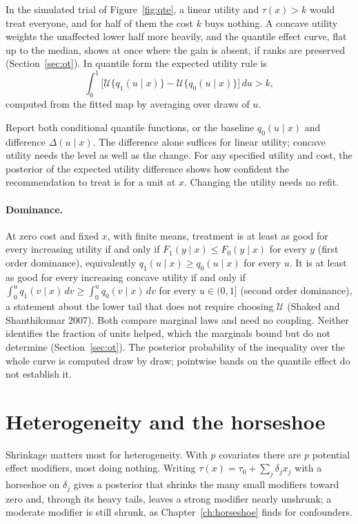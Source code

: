 In the simulated trial of Figure~\ref{fig:qte}, a linear utility and $\tau(x) > k$ would treat everyone, and for half of them the cost $k$ buys nothing. A concave utility weights the unaffected lower half more heavily, and the quantile effect curve, flat up to the median, shows at once where the gain is absent, if ranks are preserved (Section~\ref{sec:ot}). In quantile form the expected utility rule is
\[
\int_0^1 \bigl[\mathcal{U}\{q_1(u \mid x)\} - \mathcal{U}\{q_0(u \mid x)\}\bigr]\,du > k,
\]
computed from the fitted map by averaging over draws of $u$.

Report both conditional quantile functions, or the baseline $q_0(u \mid x)$ and difference $\Delta(u \mid x)$. The difference alone suffices for linear utility; concave utility needs the level as well as the change. For any specified utility and cost, the posterior of the expected utility difference shows how confident the recommendation to treat is for a unit at $x$. Changing the utility needs no refit.

\paragraph{Dominance.} At zero cost and fixed $x$, with finite means, treatment is at least as good for every increasing utility if and only if $F_1(y \mid x) \leq F_0(y \mid x)$ for every $y$ (first order dominance), equivalently $q_1(u \mid x) \geq q_0(u \mid x)$ for every $u$. It is at least as good for every increasing concave utility if and only if $\int_0^u q_1(v \mid x)\,dv \geq \int_0^u q_0(v \mid x)\,dv$ for every $u \in (0, 1]$ (second order dominance), a statement about the lower tail that does not require choosing $\mathcal{U}$ (Shaked and Shanthikumar 2007). Both compare marginal laws and need no coupling. Neither identifies the fraction of units helped, which the marginals bound but do not determine (Section~\ref{sec:ot}). The posterior probability of the inequality over the whole curve is computed draw by draw; pointwise bands on the quantile effect do not establish it.

\section{Heterogeneity and the horseshoe}

Shrinkage matters most for heterogeneity. With $p$ covariates there are $p$ potential effect modifiers, most doing nothing. Writing $\tau(x) = \tau_0 + \sum_j \delta_j x_j$ with a horseshoe on $\delta_j$ gives a posterior that shrinks the many small modifiers toward zero and, through its heavy tails, leaves a strong modifier nearly unshrunk; a moderate modifier is still shrunk, as Chapter~\ref{ch:horseshoe} finds for confounders.

